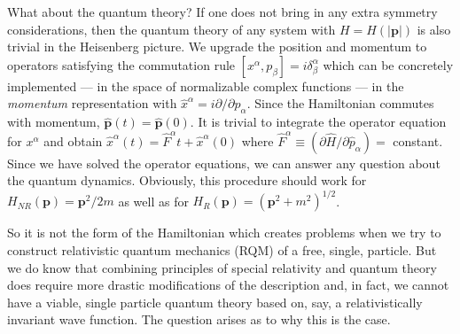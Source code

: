 \documentclass{article}
\begin{document}
What about the quantum theory? If one does not bring in any extra symmetry considerations, then the quantum theory of any system with $H=H(|\bm{p}|)$ is also trivial in the Heisenberg picture. We upgrade the position and momentum to operators satisfying the commutation rule
 $[x^\alpha, p_\beta]=i\delta^\alpha_\beta$ which can be concretely implemented --- in the space of normalizable complex functions --- in the \textit{momentum} representation with $\hat{x}^\alpha = i \partial/\partial p_\alpha$. Since the Hamiltonian commutes with momentum, $\hat{\bm{p}}(t) = \hat{\bm{p}}(0)$. It is trivial to integrate the operator equation for $x^\alpha$  and obtain $\hat{x}^\alpha(t) = \hat{F}^\alpha t + \hat{x}^\alpha(0)$ where $\hat{F}^\alpha\equiv (\partial \hat{H}/\partial \hat{p}_\alpha) = $ constant. Since we have solved  the operator equations, we can answer any question about the quantum dynamics. Obviously, this procedure should work for $ H_{NR}(\bm{p})=\bm{p}^2/2m$ as well as for $H_{R}(\bm{p})=(\bm{p}^2+m^2)^{1/2}$. 
 
 So it is not the form of the Hamiltonian which creates problems when we try to construct relativistic quantum mechanics (RQM) of a free, single, particle. But we do know that combining principles of special relativity and quantum theory does require more drastic modifications of the description and, in fact, we cannot have a viable, single particle quantum theory based on, say, a relativistically invariant wave function. The question arises as to why this is the case.
 
\end{document}
